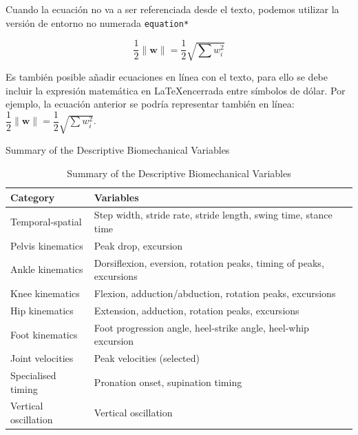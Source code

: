 Cuando la ecuación no va a ser referenciada desde el texto, podemos utilizar la versión de entorno no numerada \verb|equation*|

\begin{equation*}
\label{Eq:ejemplo_ecuacion2}
\dfrac{1}{2}\parallel\mathbf{w}\parallel=\dfrac{1}{2}\sqrt{\sum w_{i}^{2}}
\end{equation*}

Es también posible añadir ecuaciones en línea con el texto, para ello se debe incluir la expresión matemática en \LaTeX encerrada entre símbolos de dólar. Por ejemplo, la ecuación anterior se podría representar también en línea: $\dfrac{1}{2}\parallel\mathbf{w}\parallel=\dfrac{1}{2}\sqrt{\sum w_{i}^{2}}$.


\centering
\begin{table}[ht]
    \caption[Descriptive Variables Summary]{Summary of the Descriptive Biomechanical Variables\label{tab:met-desc-variable-init}}
    \caption{Summary of the Descriptive Biomechanical Variables}
    \begin{tabular}[t]{lp{}}
    \hline
    Category & Variables \\
    \hline
    Temporal-spatial & Step width, stride rate, stride length, swing time, stance time \\
    Pelvis kinematics & Peak drop, excursion \\
    Ankle kinematics & Dorsiflexion, eversion, rotation peaks, timing of peaks, excursions \\
    Knee kinematics & Flexion, adduction/abduction, rotation peaks, excursions \\
    Hip kinematics & Extension, adduction, rotation peaks, excursions \\
    Foot kinematics & Foot progression angle, heel-strike angle, heel-whip excursion \\
    Joint velocities & Peak velocities (selected) \\
    Specialised timing & Pronation onset, supination timing \\
    Vertical oscillation & Vertical oscillation \\
    \hline
    \end{tabular}
\end{table}